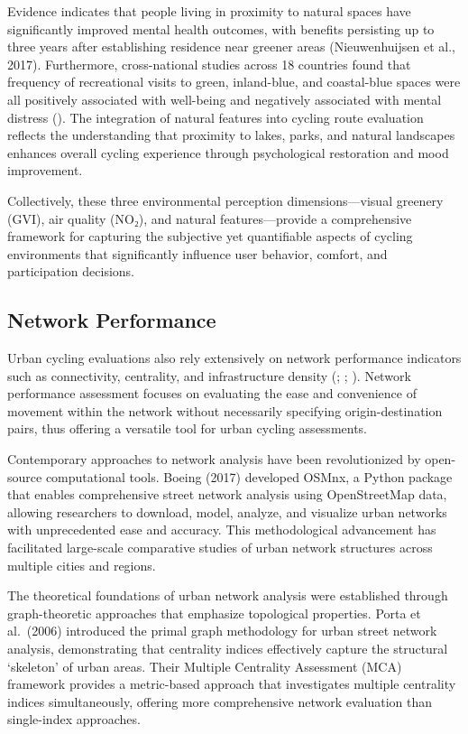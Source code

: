 \documentclass[
  12pt,
  oneside]{book}
\begin{document}
Evidence indicates that people living in proximity to natural spaces have significantly improved mental health outcomes, with benefits persisting up to three years after establishing residence near greener areas (Nieuwenhuijsen et al., 2017). Furthermore, cross-national studies across 18 countries found that frequency of recreational visits to green, inland-blue, and coastal-blue spaces were all positively associated with well-being and negatively associated with mental distress (\textcite{hooyberg_general_2020}). The integration of natural features into cycling route evaluation reflects the understanding that proximity to lakes, parks, and natural landscapes enhances overall cycling experience through psychological restoration and mood improvement.

Collectively, these three environmental perception dimensions---visual greenery (GVI), air quality (NO₂), and natural features---provide a comprehensive framework for capturing the subjective yet quantifiable aspects of cycling environments that significantly influence user behavior, comfort, and participation decisions.

\subsection{Network Performance}\label{network-performance}

Urban cycling evaluations also rely extensively on network performance indicators such as connectivity, centrality, and infrastructure density (\textcite{lowry_assessment_2012}; \textcite{geurs_multi-modal_2016}; \textcite{buehler_bikeway_2016}). Network performance assessment focuses on evaluating the ease and convenience of movement within the network without necessarily specifying origin-destination pairs, thus offering a versatile tool for urban cycling assessments.

Contemporary approaches to network analysis have been revolutionized by open-source computational tools. Boeing (2017) developed OSMnx, a Python package that enables comprehensive street network analysis using OpenStreetMap data, allowing researchers to download, model, analyze, and visualize urban networks with unprecedented ease and accuracy. This methodological advancement has facilitated large-scale comparative studies of urban network structures across multiple cities and regions.

The theoretical foundations of urban network analysis were established through graph-theoretic approaches that emphasize topological properties. Porta et al.~(2006) introduced the primal graph methodology for urban street network analysis, demonstrating that centrality indices effectively capture the structural `skeleton' of urban areas. Their Multiple Centrality Assessment (MCA) framework provides a metric-based approach that investigates multiple centrality indices simultaneously, offering more comprehensive network evaluation than single-index approaches.
\end{document}
